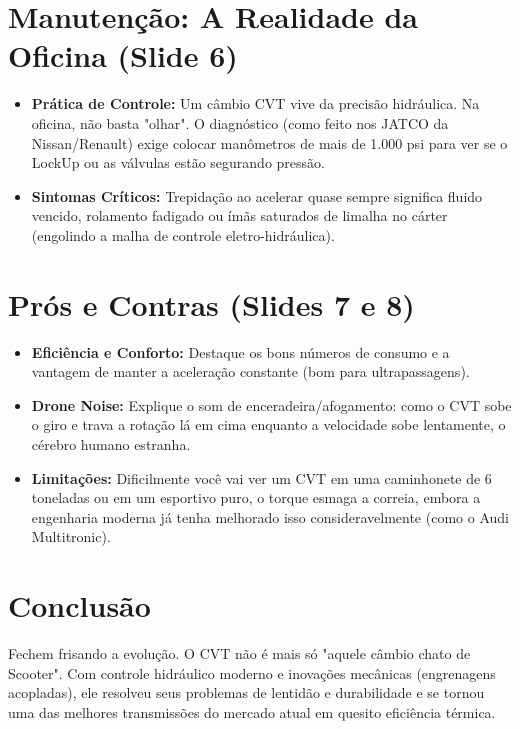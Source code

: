 \documentclass[12pt,a4paper]{article}
\begin{document}
\section{Manutenção: A Realidade da Oficina (Slide 6)}
\begin{itemize}
    \item \textbf{Prática de Controle:} Um câmbio CVT vive da precisão hidráulica. Na oficina, não basta "olhar". O diagnóstico (como feito nos JATCO da Nissan/Renault) exige colocar manômetros de mais de 1.000 psi para ver se o LockUp ou as válvulas estão segurando pressão.
    \item \textbf{Sintomas Críticos:} Trepidação ao acelerar quase sempre significa fluido vencido, rolamento fadigado ou ímãs saturados de limalha no cárter (engolindo a malha de controle eletro-hidráulica).
\end{itemize}

\section{Prós e Contras (Slides 7 e 8)}
\begin{itemize}
    \item \textbf{Eficiência e Conforto:} Destaque os bons números de consumo e a vantagem de manter a aceleração constante (bom para ultrapassagens).
    \item \textbf{Drone Noise:} Explique o som de enceradeira/afogamento: como o CVT sobe o giro e trava a rotação lá em cima enquanto a velocidade sobe lentamente, o cérebro humano estranha.
    \item \textbf{Limitações:} Dificilmente você vai ver um CVT em uma caminhonete de 6 toneladas ou em um esportivo puro, o torque esmaga a correia, embora a engenharia moderna já tenha melhorado isso consideravelmente (como o Audi Multitronic).
\end{itemize}

\section{Conclusão}
Fechem frisando a evolução. O CVT não é mais só "aquele câmbio chato de Scooter". Com controle hidráulico moderno e inovações mecânicas (engrenagens acopladas), ele resolveu seus problemas de lentidão e durabilidade e se tornou uma das melhores transmissões do mercado atual em quesito eficiência térmica.
\end{document}

